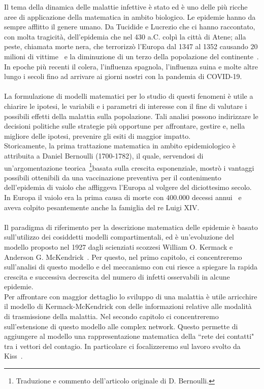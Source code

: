 \documentclass[12pt,a4paper,twoside]{report}
\begin{document}
Il tema della dinamica delle malattie infettive \`e stato ed \`e uno delle pi\`u ricche aree di applicazione della matematica in ambito biologico.  Le epidemie hanno  da sempre afflitto il genere umano.  Da Tucidide e Lucrezio che ci hanno raccontato,  con molta tragicit\`a,  dell'epidemia che nel 430 a.C.  colp\`i la citt\`a di Atene; alla  peste,  chiamata morte nera,   che terrorizz\`o l'Europa dal 1347 al 1352 causando $20$ milioni di vittime~\cite{ujvari2020storia} e  la diminuzione di  un terzo della popolazione del continente~\cite{alchon2003pest}.  In epoche pi\`u recenti il colera,  l'influenza spagnola,  l'influenza suina e molte altre lungo i  secoli fino ad arrivare ai giorni nostri con la pandemia di COVID-19.\\ \\
La formulazione di modelli matematici per lo  studio di questi fenomeni \`e utile a chiarire le ipotesi, le variabili e i parametri di interesse con il fine di valutare i possibili effetti della malattia sulla popolazione. Tali analisi possono indirizzare le decisioni politiche sulle strategie pi\`u opportune per affrontare, gestire e, nella migliore delle ipotesi, prevenire gli esiti di maggior impatto.\\ Storicamente,  la prima trattazione matematica in ambito   epidemiologico \`e attribuita  a Daniel Bernoulli (1700-1782), il quale, servendosi di un'argomentazione teorica~\cite{Bernoulli}\footnote{Traduzione e commento dell'articolo originale di D. Bernoulli.}basata sulla crescita esponenziale,  mostr\`o i  vantaggi possibili ottenibili da una vaccinazione preventiva per il contenimento dell'epidemia di vaiolo che affliggeva l'Europa al volgere del diciottesimo secolo. In Europa il vaiolo era la prima causa di morte con $400.000$ decessi annui~\cite{VAIOLO} e aveva colpito pesantemente anche la famiglia del re Luigi XIV.\\ \\
Il paradigma di riferimento per la descrizione matematica delle epidemie \`e basato sull'utilizzo dei cosiddetti modelli compartimentali, ed \`e un'evoluzione del modello proposto nel 1927 dagli scienziati scozzesi William O. Kermack e Anderson G. McKendrick~\cite{kermack}.  Per questo, nel primo capitolo, ci concentreremo sull'analisi di questo modello e del meccanismo con cui riesce a spiegare la rapida crescita e successiva decrescita del numero di infetti osservabili in alcune epidemie.\\ 
Per affrontare con maggior dettaglio lo sviluppo di una malattia \`e utile arricchire il modello di Kermack-McKendrick con delle informazioni relative alle modalit\`a di trasmissione della malattia. Nel secondo capitolo ci concentreremo sull'estensione di questo modello alle complex network. Questo permette di aggiungere al modello una rappresentazione matematica della  ``rete dei contatti" tra i vettori del contagio. In particolare ci focalizzeremo sul lavoro svolto da Kiss~\cite{KISS}.\\
\end{document}
